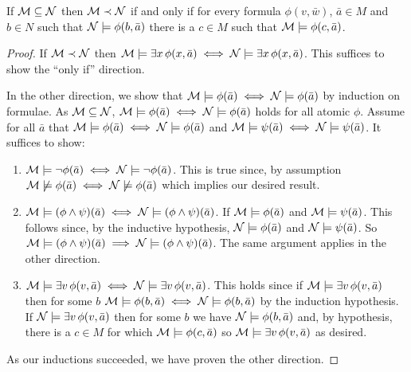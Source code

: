 \begin{theorem}\label{theorem_tarski_vaught_test}
If \(\mathcal{M} \subseteq \mathcal{N}\) then \(\mathcal{M} \prec \mathcal{N}\) if and only if for every formula \(\phi(v, \bar{w})\), \(\bar{a} \in M\) and \(b \in N\) such that \(\mathcal{N} \models \phi(b, \bar{a})\) there is a \(c \in M\) such that \(\mathcal{M} \models \phi(c, \bar{a})\).
\end{theorem}

\begin{proof}
If \(\mathcal{M} \prec \mathcal{N}\) then \(\mathcal{M} \models \exists x \, \phi(x, \bar{a}) \iff \mathcal{N} \models \exists x \, \phi(x, \bar{a})\). This suffices to show the ``only if'' direction.

In the other direction, we show that \(\mathcal{M} \models \phi(\bar{a}) \iff \mathcal{N} \models \phi(\bar{a})\) by induction on formulae. 
As \(\mathcal{M} \subseteq \mathcal{N}\), \(\mathcal{M} \models \phi(\bar{a}) \iff \mathcal{N} \models \phi(\bar{a})\) holds for all atomic \(\phi\).
Assume for all \(\bar{a}\) that  \(\mathcal{M} \models \phi(\bar{a}) \iff \mathcal{N} \models \phi(\bar{a})\) and \(\mathcal{M} \models \psi(\bar{a}) \iff \mathcal{N} \models \psi(\bar{a})\).
It suffices to show:
\begin{enumerate}
\item \(\mathcal{M} \models \neg \phi(\bar{a}) \iff \mathcal{N} \models \neg \phi(\bar{a})\). This is true since, by assumption \(\mathcal{M} \not \models \phi(\bar{a}) \iff \mathcal{N} \not \models \phi(\bar{a})\) which implies our desired result. 
\item \(\mathcal{M} \models (\phi\land\psi)(\bar{a}) \iff \mathcal{N} \models (\phi\land\psi)(\bar{a})\). If \(\mathcal{M} \models \phi(\bar{a})\) and \(\mathcal{M} \models \psi(\bar{a})\). This follows since, by the inductive hypothesis,  \(\mathcal{N} \models \phi(\bar{a})\) and \(\mathcal{N} \models \psi(\bar{a})\). So \(\mathcal{M} \models (\phi \land \psi)(\bar{a}) \implies \mathcal{N} \models (\phi \land \psi)(\bar{a})\). The same argument applies in the other direction. 
\item \(\mathcal{M} \models \exists v \, \phi(v, \bar{a}) \iff \mathcal{N} \models \exists v \, \phi(v, \bar{a})\). This holds since if \(\mathcal{M} \models \exists v \, \phi(v, \bar{a})\) then for some \(b\) \(\mathcal{M} \models \phi(b, \bar{a}) \iff \mathcal{N} \models \phi(b, \bar{a})\) by the induction hypothesis. If \(\mathcal{N} \models \exists v \, \phi(v, \bar{a})\) then for some \(b\) we have \(\mathcal{N} \models \phi(b, \bar{a})\) and, by hypothesis, there is a \(c \in M\) for which \(\mathcal{M} \models \phi(c, \bar{a})\) so \(\mathcal{M} \models \exists v\, \phi(v, \bar{a})\) as desired.    
\end{enumerate} 
As our inductions succeeded, we have proven the other direction. 
\end{proof}

